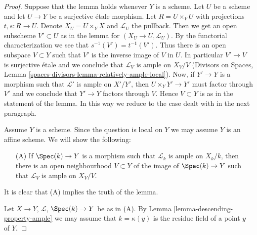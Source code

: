 \begin{proof}
Suppose that the lemma holds whenever $Y$ is a scheme.
Let $U$ be a scheme and let $U \to Y$ be a surjective \'etale morphism.
Let $R = U \times_Y U$ with projections $t, s : R \to U$.
Denote $X_U = U \times_Y X$ and $\mathcal{L}_U$ the pullback.
Then we get an open subscheme $V' \subset U$ as in the lemma
for $(X_U \to U, \mathcal{L}_U)$. By the functorial characterization
we see that $s^{-1}(V') = t^{-1}(V')$.
Thus there is an open subspace $V \subset Y$ such that
$V'$ is the inverse image of $V$ in $U$.
In particular $V' \to V$ is surjective \'etale and we
conclude that $\mathcal{L}_V$ is ample on $X_V/V$
(Divisors on Spaces, Lemma \ref{spaces-divisors-lemma-relatively-ample-local}).
Now, if $Y' \to Y$ is a morphism such that
$\mathcal{L}'$ is ample on $X'/Y'$, then
$U \times_Y Y' \to Y'$ must factor through $V'$
and we conclude that $Y' \to Y$ factors through $V$.
Hence $V \subset Y$ is as in the statement of the lemma.
In this way we reduce to the case dealt with in the next
paragraph.

\medskip\noindent
Assume $Y$ is a scheme. Since the question is local on $Y$
we may assume $Y$ is an affine scheme. We will show the
following:
\begin{enumerate}
\item[(A)] If $\Spec(k) \to Y$ is a morphism such that
$\mathcal{L}_k$ is ample on $X_k/k$, then there is an
open neighbourhood $V \subset Y$ of the image of $\Spec(k) \to Y$
such that $\mathcal{L}_V$ is ample on $X_V/V$.
\end{enumerate}
It is clear that (A) implies the truth of the lemma.

\medskip\noindent
Let $X \to Y$, $\mathcal{L}$, $\Spec(k) \to Y$ be as in (A).
By Lemma \ref{lemma-descending-property-ample}
we may assume that $k = \kappa(y)$ is the residue field of a point $y$
of $Y$.


\end{proof}
